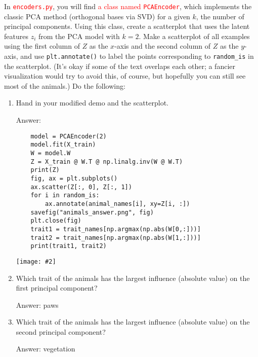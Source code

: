 \documentclass{article}
\newcommand{\gre}[1]{\textcolor{gre}{#1}}
\newcommand{\red}[1]{\textcolor{red}{#1}}
\newcommand\ans[1]{\par\gre{Answer: #1}}
\let\update\red
\newenvironment{asking}{\begingroup\color{blu}}{\endgroup}
\newcommand{\centerfig}[2]{\begin{center}\texttt{[image: \#2]}\end{center}}
\begin{document}
In \update{\texttt{encoders.py}}, you will find \update{a class named \texttt{PCAEncoder}}, which implements the classic PCA method (orthogonal bases via SVD) for a given $k$, the number of principal components. Using this class, create a scatterplot that uses the latent features $z_i$ from the PCA model with $k=2$.
Make a scatterplot of all examples using the first column of $Z$ as the $x$-axis and the second column of $Z$ as the $y$-axis, and use \texttt{plt.annotate()} to label the points corresponding to \verb|random_is| in the scatterplot.
(It's okay if some of the text overlaps each other; a fancier visualization would try to avoid this, of course, but hopefully you can still see most of the animals.)
Do the following:
\newpage
\begin{asking}
	\begin{enumerate}
		\item  Hand in your modified demo and the scatterplot.
        \ans{}
\begin{verbatim}
    model = PCAEncoder(2)
    model.fit(X_train)
    W = model.W
    Z = X_train @ W.T @ np.linalg.inv(W @ W.T)
    print(Z)
    fig, ax = plt.subplots()
    ax.scatter(Z[:, 0], Z[:, 1])
    for i in random_is:
        ax.annotate(animal_names[i], xy=Z[i, :])
    savefig("animals_answer.png", fig)
    plt.close(fig)
    trait1 = trait_names[np.argmax(np.abs(W[0,:]))]
    trait2 = trait_names[np.argmax(np.abs(W[1,:]))]
    print(trait1, trait2)
\end{verbatim}
\centerfig{0.5}{figs/animals_answer.png}

		\item Which trait of the animals has the largest influence (absolute value) on the first principal component?
        \ans{paws}
		\item Which trait of the animals has the largest influence (absolute value) on the second principal component?
        \ans{vegetation}
    \end{enumerate}
\end{asking}
\newpage
\end{document}
